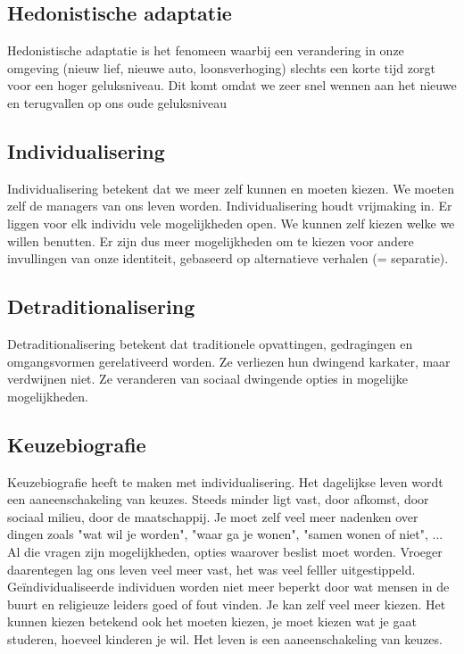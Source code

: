 \documentclass[11pt,a4paper,titlepage]{article}
\begin{document}
\subsection{Hedonistische adaptatie}
Hedonistische adaptatie is het fenomeen waarbij een verandering in onze omgeving (nieuw lief, nieuwe auto, loonsverhoging) slechts een korte tijd zorgt voor een hoger geluksniveau. Dit komt omdat we zeer snel wennen aan het nieuwe en terugvallen op ons oude geluksniveau

\subsection{Individualisering}
Individualisering betekent dat we meer zelf kunnen en moeten kiezen. We moeten zelf de managers van ons leven worden. Individualisering houdt vrijmaking in. Er liggen voor elk individu vele mogelijkheden open. We kunnen zelf kiezen welke we willen benutten. Er zijn dus meer mogelijkheden om te kiezen voor andere invullingen van onze identiteit, gebaseerd op alternatieve verhalen (= separatie).

\subsection{Detraditionalisering}
Detraditionalisering betekent dat traditionele opvattingen, gedragingen en omgangsvormen gerelativeerd worden. Ze verliezen hun dwingend karkater, maar verdwijnen niet. Ze veranderen van sociaal dwingende opties in mogelijke mogelijkheden.

\subsection{Keuzebiografie}
Keuzebiografie heeft te maken met individualisering. Het dagelijkse leven wordt een aaneenschakeling van keuzes. Steeds minder ligt vast, door afkomst, door sociaal milieu, door de maatschappij. Je moet zelf veel meer nadenken over dingen zoals "wat wil je worden", "waar ga je wonen", "samen wonen of niet", ...
Al die vragen zijn mogelijkheden, opties waarover beslist moet worden. Vroeger daarentegen lag ons leven veel meer vast, het was veel felller uitgestippeld.
Geïndividualiseerde individuen worden niet meer beperkt door wat mensen in de buurt en religieuze leiders goed of fout vinden. Je kan zelf veel meer kiezen. Het kunnen kiezen betekend ook het moeten kiezen, je moet kiezen wat je gaat studeren, hoeveel kinderen je wil. Het leven is een aaneenschakeling van keuzes.
\end{document}
